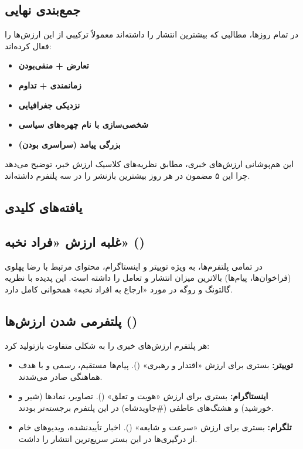 \documentclass{article}
\begin{document}
	\subsection{جمع‌بندی نهایی}
	
	در تمام روزها، مطالبی که بیشترین انتشار را داشته‌اند معمولاً ترکیبی از این ارزش‌ها را فعال کرده‌اند:
	
	\begin{itemize}
		\item \textbf{تعارض + منفی‌بودن}
		\item \textbf{زمانمندی + تداوم}
		\item \textbf{نزدیکی جغرافیایی}
		\item \textbf{شخصی‌سازی با نام چهره‌های سیاسی}
		\item \textbf{بزرگی پیامد (سراسری بودن)}
	\end{itemize}
	
	این هم‌پوشانی ارزش‌های خبری، مطابق نظریه‌های کلاسیک ارزش خبر، توضیح می‌دهد چرا این ۵ مضمون در هر روز بیشترین بازنشر را در سه پلتفرم داشته‌اند.

	

	
	\subsection{یافته‌های کلیدی}
	
	\subsection{غلبه ارزش «فراد نخبه» ()}
	در تمامی پلتفرم‌ها، به ویژه توییتر و اینستاگرام، محتوای مرتبط با رضا پهلوی (فراخوان‌ها، پیام‌ها) بالاترین میزان انتشار و تعامل را داشته است. این پدیده با نظریه گالتونگ و روگه در مورد «ارجاع به افراد نخبه» همخوانی کامل دارد.
	
	\subsection{پلتفرمی شدن ارزش‌ها ()}
	هر پلتفرم ارزش‌های خبری را به شکلی متفاوت بازتولید کرد:
	
	\begin{itemize}
		\item \textbf{توییتر:} بستری برای ارزش «اقتدار و رهبری» (). پیام‌ها مستقیم، رسمی و با هدف هماهنگی صادر می‌شدند.
		\item \textbf{اینستاگرام:} بستری برای ارزش «هویت و تعلق» (). تصاویر، نمادها (شیر و خورشید) و هشتگ‌های عاطفی (\#جاویدشاه) در این پلتفرم برجسته‌تر بودند.
		\item \textbf{تلگرام:} بستری برای ارزش «سرعت و شایعه» (). اخبار تأییدنشده، ویدیوهای خام از درگیری‌ها در این بستر سریع‌ترین انتشار را داشت.
	\end{itemize}
	
\end{document}
